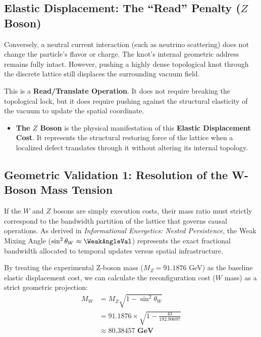 \subsection{Elastic Displacement: The ``Read'' Penalty (\texorpdfstring{$Z$}{Z} Boson)}

Conversely, a neutral current interaction (such as neutrino scattering) does not change the particle's flavor or charge. The knot's internal geometric address remains fully intact. However, pushing a highly dense topological knot through the discrete lattice still displaces the surrounding vacuum field.

This is a \textbf{Read/Translate Operation}. It does not require breaking the topological lock, but it does require pushing against the structural elasticity of the vacuum to update the spatial coordinate.
\begin{itemize}
    \item \textbf{The $Z$ Boson} is the physical manifestation of this \textbf{Elastic Displacement Cost}. It represents the structural restoring force of the lattice when a localized defect translates through it without altering its internal topology.
\end{itemize}

\subsection{Geometric Validation 1: Resolution of the W-Boson Mass Tension}

If the $W$ and $Z$ bosons are simply execution costs, their mass ratio must strictly correspond to the bandwidth partition of the lattice that governs causal operations. As derived in \textit{Informational Energetics: Nested Persistence}, the Weak Mixing Angle ($\sin^2 \theta_W \approx \WeakAngleVal$) represents the exact fractional bandwidth allocated to temporal updates versus spatial infrastructure. 

By treating the experimental Z-boson mass ($M_Z = 91.1876$ GeV) as the baseline elastic displacement cost, we can calculate the reconfiguration cost ($W$ mass) as a strict geometric projection:
\begin{equation}
\begin{split}
    M_W &= M_Z \sqrt{1 - \sin^2 \theta_W} \\
    &= 91.1876 \times \sqrt{1 - \frac{43}{192.90697}} \\
    &\approx \mathbf{80.38457 \text{ GeV}}
\end{split}
\end{equation}

